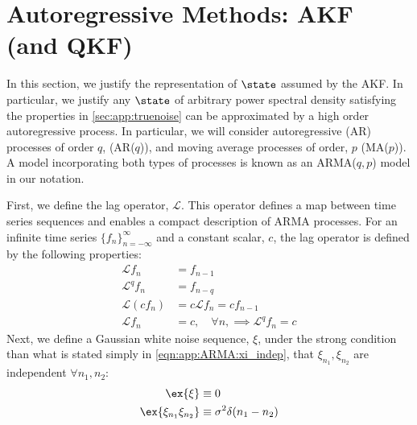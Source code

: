 \clearpage
\section{ Autoregressive Methods: AKF (and QKF) \label{sec:app:AKF}}

In this section, we justify the representation of $\state$ assumed by the AKF. In particular, we justify any $\state$ of arbitrary power spectral density satisfying the properties in \cref{sec:app:truenoise} can be approximated by a high order autoregressive process.   In particular, we will consider autoregressive (AR) processes of order $q$, (AR($q$)), and  moving average processes of order, $p$ (MA($p$)). A model incorporating both types of processes is known as an ARMA($q,p$) model in our notation. 

First, we define the lag operator, $\mathcal{L}$. This operator defines a map between time series sequences and enables a compact description of ARMA processes. For an infinite time series $\{ f_n \}_{n = -\infty}^{\infty}$ and a constant scalar, $c$, the lag operator is defined by the following properties:
\begin{align}
\mathcal{L} f_n & = f_{n-1} \\
\mathcal{L}^q f_n & = f_{n-q} \\
\mathcal{L}(cf_n) & = c\mathcal{L}f_n = cf_{n-1}  \\
\mathcal{L}f_n & = c, \quad \forall n, \implies \mathcal{L}^q f_n  = c
\end{align}
Next, we define a Gaussian white noise sequence, $\xi$, under the strong condition than what is stated simply in \cref{eqn:app:ARMA:xi_indep}, that $\xi_{n_1}, \xi_{n_2}$ are independent $\forall n_1, n_2 $:
\begin{align}
\ex{\xi} &\equiv 0  \\
\ex{\xi_{n_1} \xi_{n_2}} &\equiv \sigma^2 \delta(n_1-n_2)\label{eqn:app:ARMA:xi_indep}   
\end{align}

